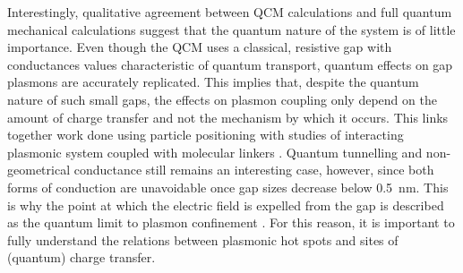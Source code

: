 \documentclass{article}
\begin{document}
Interestingly, qualitative agreement between QCM calculations and full quantum mechanical calculations suggest that the quantum nature of the system is of little importance. Even though the QCM uses a classical, resistive gap with conductances values characteristic of quantum transport, quantum effects on gap plasmons are accurately replicated. This implies that, despite the quantum nature of such small gaps, the effects on plasmon coupling only depend on the amount of charge transfer and not the mechanism by which it occurs. This links together work done using particle positioning \cite{savage2012, scholl2013} with studies of interacting plasmonic system coupled with molecular linkers \cite{tan2014, cha2014, benz2014}. Quantum tunnelling and non-geometrical conductance still remains an interesting case, however, since both forms of conduction are unavoidable once gap sizes decrease below \SI{0.5}{nm}. This is why the point at which the electric field is expelled from the gap is described as the quantum limit to plasmon confinement \cite{savage2012}. For this reason, it is important to fully understand the relations between plasmonic hot spots and sites of (quantum) charge transfer.
\end{document}
